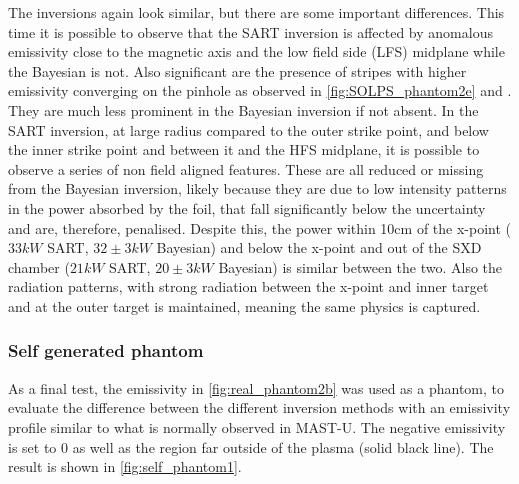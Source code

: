 The inversions again look similar, but there are some important differences. This time it is possible to observe that the SART inversion is affected by anomalous emissivity close to the magnetic axis and the low field side (LFS) midplane while the Bayesian is not. Also significant are the presence of stripes with higher emissivity converging on the pinhole as observed in \autoref{fig:SOLPS_phantom2e} and . They are much less prominent in the Bayesian inversion if not absent. In the SART inversion, at large radius compared to the outer strike point, and below the inner strike point and between it and the HFS midplane, it is possible to observe a series of non field aligned features. These are all reduced or missing from the Bayesian inversion, likely because they are due to low intensity patterns in the power absorbed by the foil, that fall significantly below the uncertainty and are, therefore, penalised. Despite this, the power within 10cm of the x-point ($33kW$ SART, $32\pm3kW$ Bayesian) and below the x-point and out of the SXD chamber ($21kW$ SART, $20\pm3kW$ Bayesian) is similar between the two. Also the radiation patterns, with strong radiation between the x-point and inner target and at the outer target is maintained, meaning the same physics is captured.

\subsubsection{Self generated phantom}

As a final test, the emissivity in \autoref{fig:real_phantom2b} was used as a phantom, to evaluate the difference between the different inversion methods with an emissivity profile similar to what is normally observed in MAST-U. The negative emissivity is set to 0 as well as the region far outside of the plasma (solid black line). The result is shown in \autoref{fig:self_phantom1}.

